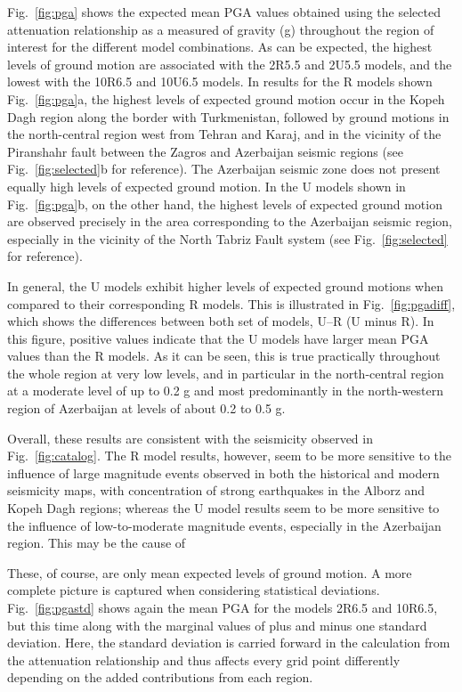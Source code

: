 Fig.~\ref{fig:pga} shows the expected mean PGA values obtained using the selected attenuation relationship as a measured of gravity (g) throughout the region of interest for the different model combinations. As can be expected, the highest levels of ground motion are associated with the 2R5.5 and 2U5.5 models, and the lowest with the 10R6.5 and 10U6.5 models. In results for the R models shown Fig.~\ref{fig:pga}a, the highest levels of expected ground motion occur in the Kopeh Dagh region along the border with Turkmenistan, followed by ground motions in the north-central region west from Tehran and Karaj, and in the vicinity of the Piranshahr fault between the Zagros and Azerbaijan seismic regions (see Fig.~\ref{fig:selected}b for reference). The Azerbaijan seismic zone does not present equally high levels of expected ground motion. In the U models shown in Fig.~\ref{fig:pga}b, on the other hand, the highest levels of expected ground motion are observed precisely in the area corresponding to the Azerbaijan seismic region, especially in the vicinity of the North Tabriz Fault system (see Fig.~\ref{fig:selected} for reference).

In general, the U models exhibit higher levels of expected ground motions when compared to their corresponding R models. This is illustrated in Fig.~\ref{fig:pgadiff}, which shows the differences between both set of models, U--R (U minus R). In this figure, positive values indicate that the U models have larger mean PGA values than the R models. As it can be seen, this is true practically throughout the whole region at very low levels, and in particular in the north-central region at a moderate level of up to 0.2 g and most predominantly in the north-western region of Azerbaijan at levels of about 0.2 to 0.5 g.

Overall, these results are consistent with the seismicity observed in Fig.~\ref{fig:catalog}. The R model results, however, seem to be more sensitive to the influence of large magnitude events observed in both the historical and modern seismicity maps, with concentration of strong earthquakes in the Alborz and Kopeh Dagh regions; whereas the U model results seem to be more sensitive to the influence of low-to-moderate magnitude events, especially in the Azerbaijan region. This may be the cause of 

These, of course, are only mean expected levels of ground motion. A more complete picture is captured when considering statistical deviations. Fig.~\ref{fig:pgastd} shows again the mean PGA for the models 2R6.5 and 10R6.5, but this time along with the marginal values of plus and minus one standard deviation. Here, the standard deviation is carried forward in the calculation from the attenuation relationship and thus affects every grid point differently depending on the added contributions from each region. 

